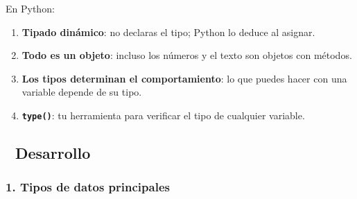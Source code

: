 \documentclass[
  doc,
  floatsintext,
  longtable,
  a4paper,
  nolmodern,
  notxfonts,
  notimes,
  12pt,
  colorlinks=true,linkcolor=blue,citecolor=blue,urlcolor=blue]{apa7}
\providecommand{\tightlist}{%
  \setlength{\itemsep}{0pt}\setlength{\parskip}{0pt}}
\begin{document}
En Python:

\begin{enumerate}
\def\labelenumi{\arabic{enumi}.}
\tightlist
\item
  \textbf{Tipado dinámico}: no declaras el tipo; Python lo deduce al
  asignar.
\item
  \textbf{Todo es un objeto}: incluso los números y el texto son objetos
  con métodos.
\item
  \textbf{Los tipos determinan el comportamiento}: lo que puedes hacer
  con una variable depende de su tipo.
\item
  \textbf{\texttt{type()}}: tu herramienta para verificar el tipo de
  cualquier variable.
\end{enumerate}

\subsection{📐 Desarrollo}\label{desarrollo}

\subsubsection{1. Tipos de datos
principales}\label{tipos-de-datos-principales}
\end{document}

